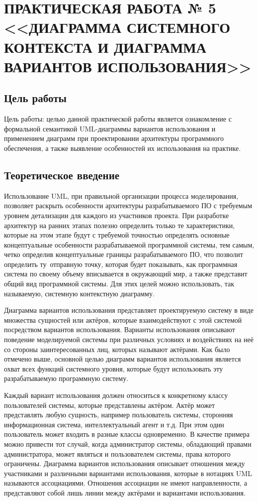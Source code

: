\chapter{ПРАКТИЧЕСКАЯ РАБОТА № 5 <<ДИАГРАММА СИСТЕМНОГО КОНТЕКСТА И ДИАГРАММА ВАРИАНТОВ ИСПОЛЬЗОВАНИЯ>>}

\section{Цель работы}

Цель работы: целью данной практической работы является ознакомление с формальной семантикой UML-диаграммы вариантов использования и применением диаграмм при проектировании архитектуры программного обеспечения, а также выявление особенностей их использования на практике.

\section{Теоретическое введение}

Использование UML, при правильной организации процесса моделирования, позволяет раскрыть особенности архитектуры разрабатываемого ПО с требуемым уровнем детализации для каждого из участников проекта. При разработке архитектур на ранних этапах полезно определить только те характеристики, которые на этом этапе будут с требуемой точностью определять основные концептуальные особенности разрабатываемой программной системы, тем самым, четко определив концептуальные границы разрабатываемого ПО, что позволит определить ту отправную точку, которая будет показывать, как программная система по своему объему вписывается в окружающий мир, а также представит общий вид программной системы. Для этих целей можно использовать, так называемую, системную контекстную диаграмму.

Диаграмма вариантов использования представляет проектируемую систему в виде множества сущностей или актёров, которые взаимодействуют с этой системой посредством вариантов использования. Варианты использования описывают поведение моделируемой системы при различных условиях и воздействиях на неё со стороны заинтересованных лиц, которых называют актёрами. Как было отмечено выше, основной целью диаграмм вариантов использования является охват всех функций системного уровня, которые будут использовать эту разрабатываемую программную систему.

Каждый вариант использования должен относиться к конкретному классу пользователей системы, которые представлены актёром. Актёр может представлять любую сущность, например пользователь системы, сторонняя информационная система, интеллектуальный агент и т.д. При этом один пользователь может входить в разные классы одновременно. В качестве примера можно привести тот случай, когда администратор системы, обладающий правами администратора, может являться и пользователем системы, права которого ограничены.
Диаграмма вариантов использования описывает отношения между участниками и различными вариантами использования, которые в нотациях UML называются ассоциациями. Отношения ассоциации не имеют направленности, а представляют собой лишь линии между актёрами и вариантами использования.


